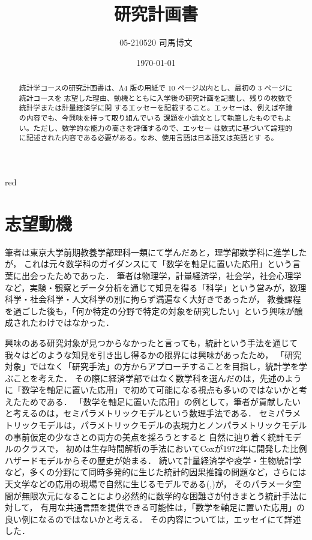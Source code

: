\documentclass[uplatex, dvipdfmx]{jsarticle}
\title{研究計画書}
\author{05-210520 司馬博文}
\date{\today}
\begin{document}
\begin{tbox}{red}{}
    \begin{abstract}
        統計学コースの研究計画書は、A4 版の用紙で 10 ページ以内とし、最初の 3 ページに統計コースを
        志望した理由、動機とともに入学後の研究計画を記載し、残りの枚数で統計学または計量経済学に関
        するエッセーを記載すること。エッセーは、例えば卒論の内容でも、今興味を持って取り組んでいる
        課題を小論文として執筆したものでもよい。ただし、数学的な能力の高さを評価するので、エッセー
        は数式に基づいて論理的に記述された内容である必要がある。なお、使用言語は日本語又は英語とす
        る。
    \end{abstract}
\end{tbox}

\section*{志望動機}

筆者は東京大学前期教養学部理科一類にて学んだあと，理学部数学科に進学したが，
これは元々数学科のガイダンスにて「数学を軸足に置いた応用」という言葉に出会ったためであった．
筆者は物理学，計量経済学，社会学，社会心理学など，実験・観察とデータ分析を通じて知見を得る「科学」という営みが，数理科学・社会科学・人文科学の別に拘らず満遍なく大好きであったが，
教養課程を過ごした後も，「何か特定の分野で特定の対象を研究したい」という興味が醸成されたわけではなかった．

興味のある研究対象が見つからなかったと言っても，統計という手法を通じて我々はどのような知見を引き出し得るかの限界には興味があったため，
「研究対象」ではなく「研究手法」の方からアプローチすることを目指し，統計学を学ぶことを考えた．
その際に経済学部ではなく数学科を選んだのは，先述のように「数学を軸足に置いた応用」で初めて可能になる視点も多いのではないかと考えたためである．
「数学を軸足に置いた応用」の例として，筆者が貢献したいと考えるのは，セミパラメトリックモデルという数理手法である．
セミパラメトリックモデルは，パラメトリックモデルの表現力とノンパラメトリックモデルの事前仮定の少なさとの両方の美点を採ろうとすると
自然に辿り着く統計モデルのクラスで，
初めは生存時間解析の手法においてCoxが1972年に開発した比例ハザードモデルからその歴史が始まる．
続いて計量経済学や疫学・生物統計学など，多くの分野にて同時多発的に生じた統計的因果推論の問題など，さらには天文学などの応用の現場で自然に生じるモデルである(\cite{Bickel},\cite{Bickel and Robins})が，
そのパラメータ空間が無限次元になることにより必然的に数学的な困難さが付きまとう統計手法に対して，
有用な共通言語を提供できる可能性は，「数学を軸足に置いた応用」の良い例になるのではないかと考える．
その内容については，エッセイにて詳述した．
\end{document}
